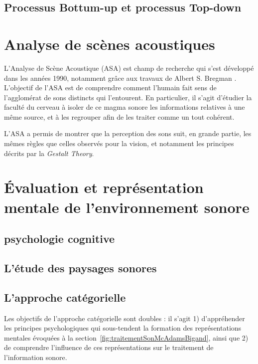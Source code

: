 \subsection{Processus Bottum-up et processus Top-down}


\section{Analyse de scènes acoustiques}
\label{sec:ASA}

L'Analyse de Scène Acoustique (ASA) est champ de recherche qui s'est développé dans les années 1990, notamment grâce aux travaux de Albert S. Bregman \cite{bregman1994auditory}. L'objectif de l'ASA est de comprendre comment l'humain fait sens de l'agglomérat de sons distincts qui l'entourent. En particulier, il s'agit d'étudier la faculté du cerveau à isoler de ce magma sonore les informations relatives à une même source, et à les regrouper afin de les traiter comme un tout cohérent.

L'ASA a permis de montrer que la perception des sons suit, en grande partie, les mêmes règles que celles observés pour la vision, et notamment les principes décrits par la \textit{Gestalt Theory}.

\section{Évaluation et représentation mentale de l'environnement sonore}
\label{sec:psychoCog}

\subsection{psychologie cognitive}

\subsection{L'étude des paysages sonores}

\subsection{L'approche catégorielle}

Les objectifs de l'approche catégorielle sont doubles : il s'agit 1) d'appréhender les principes psychologiques qui sous-tendent la formation des représentations mentales évoquées à la section~\ref{fig:traitementSonMcAdamsBigand}, ainsi que 2) de comprendre l'influence de ces représentations sur le traitement de l'information sonore. 

